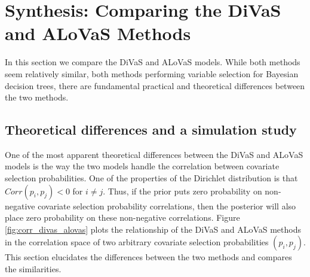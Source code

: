 \section{Synthesis: Comparing the DiVaS and ALoVaS Methods}
In this section we compare the DiVaS and ALoVaS models. While both methods seem relatively similar, both methods performing variable selection for Bayesian decision trees, there are fundamental practical and theoretical differences between the two methods. 

\subsection{Theoretical differences and a simulation study}

One of the most apparent theoretical differences between the DiVaS and ALoVaS models is the way the two models handle the correlation between covariate selection probabilities. One of the properties of the Dirichlet distribution is that $Corr(p_i,p_j) < 0$ for $i\neq j$. Thus, if the prior puts zero probability on non-negative covariate selection probability correlations, then the posterior will also place zero probability on these non-negative correlations. Figure \ref{fig:corr_divas_alovas} plots the relationship of the DiVaS and ALoVaS methods in the correlation space of two arbitrary covariate selection probabilities $(p_i,p_j)$. This section elucidates the differences between the two methods and compares the similarities. 



